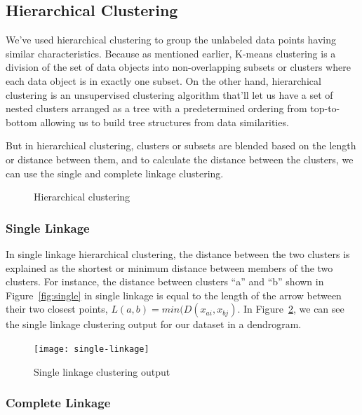 \documentclass{swfuthesise}
\begin{document}
\subsection{Hierarchical Clustering}

We've used hierarchical clustering to group the unlabeled data points having similar characteristics. Because as mentioned earlier, K-means clustering is a division of the set of data objects into non-overlapping subsets or clusters where each data object is in exactly one subset. On the other hand, hierarchical clustering is an unsupervised clustering algorithm that'll let us have a set of nested clusters arranged as a tree with a predetermined ordering from top-to-bottom allowing us to build tree structures from data similarities.

But in hierarchical clustering, clusters or subsets are blended based on the length or distance between them, and to calculate the distance between the clusters, we can use the single and complete linkage clustering.

\begin{figure}[htp]
  \centering%
  \qquad\qquad
  \caption{Hierarchical clustering\label{fig:hier-clustering}}
\end{figure}

\subsubsection{Single Linkage}

In single linkage hierarchical clustering, the distance between the two clusters is
explained as the shortest or minimum distance between members of the two clusters.
For instance, the distance between clusters ``a'' and ``b'' shown in Figure~\ref{fig:single}
in single linkage is equal to the length of the arrow between their two closest points,
\(L(a,b) = min(D(x_{ai},x_{bj})\). In Figure~\ref{fig:single-linkage}, we can see the single linkage clustering output for our dataset in a dendrogram. 

\begin{figure}[htp]
  \centering \texttt{[image: single-linkage]}
  \caption{Single linkage clustering output}
  \label{fig:single-linkage}
\end{figure}
  
\subsubsection{Complete Linkage}
\end{document}
